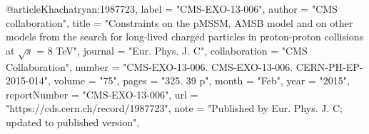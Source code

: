 @article{Khachatryan:1987723,
      label          = "CMS-EXO-13-006",
      author        = "{CMS collaboration}",
      title         = "{Constraints on the pMSSM, AMSB model and on other models
                       from the search for long-lived charged particles in
                       proton-proton collisions at $\sqrt{s}$ = 8 TeV}",
      journal       = "Eur. Phys. J. C",
      collaboration = "CMS Collaboration",
      number        = "CMS-EXO-13-006. CMS-EXO-13-006. CERN-PH-EP-2015-014",
      volume        = "75",
      pages         = "325. 39 p",
      month         = "Feb",
      year          = "2015",
      reportNumber  = "CMS-EXO-13-006",
      url           = "https://cds.cern.ch/record/1987723",
      note          = "Published by Eur. Phys. J. C; updated to published
                       version",
}

